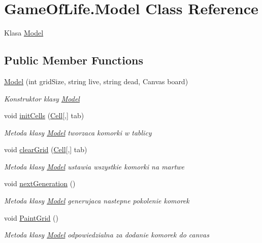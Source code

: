 \hypertarget{class_game_of_life_1_1_model}{}\section{Game\+Of\+Life.\+Model Class Reference}
\label{class_game_of_life_1_1_model}


Klasa \mbox{\hyperlink{class_game_of_life_1_1_model}{Model}}  


\subsection*{Public Member Functions}
\begin{DoxyCompactItemize}
\item 
\mbox{\hyperlink{class_game_of_life_1_1_model_a4f6448745349c6f9d1f328a67e387570}{Model}} (int grid\+Size, string live, string dead, Canvas board)
\begin{DoxyCompactList}\small\item\em Konstruktor klasy \mbox{\hyperlink{class_game_of_life_1_1_model}{Model}} \end{DoxyCompactList}\item 
void \mbox{\hyperlink{class_game_of_life_1_1_model_af96487f644682e8fd22a29a0670b874e}{init\+Cells}} (\mbox{\hyperlink{class_game_of_life_1_1_cell}{Cell}}\mbox{[},\mbox{]} tab)
\begin{DoxyCompactList}\small\item\em Metoda klasy \mbox{\hyperlink{class_game_of_life_1_1_model}{Model}} tworzaca komorki w tablicy \end{DoxyCompactList}\item 
void \mbox{\hyperlink{class_game_of_life_1_1_model_a1f60c15d9edf8f615f5ea063cf9c6495}{clear\+Grid}} (\mbox{\hyperlink{class_game_of_life_1_1_cell}{Cell}}\mbox{[},\mbox{]} tab)
\begin{DoxyCompactList}\small\item\em Metoda klasy \mbox{\hyperlink{class_game_of_life_1_1_model}{Model}} ustawia wszystkie komorki na martwe \end{DoxyCompactList}\item 
void \mbox{\hyperlink{class_game_of_life_1_1_model_adcbc7e10087aa7beeebd38c874c48d1f}{next\+Generation}} ()
\begin{DoxyCompactList}\small\item\em Metoda klasy \mbox{\hyperlink{class_game_of_life_1_1_model}{Model}} generujaca nastepne pokolenie komorek \end{DoxyCompactList}\item 
void \mbox{\hyperlink{class_game_of_life_1_1_model_afded2a6d8bc86d345362e0c3d422e584}{Paint\+Grid}} ()
\begin{DoxyCompactList}\small\item\em Metoda klasy \mbox{\hyperlink{class_game_of_life_1_1_model}{Model}} odpowiedzialna za dodanie komorek do canvas \end{DoxyCompactList}\end{DoxyCompactItemize}
